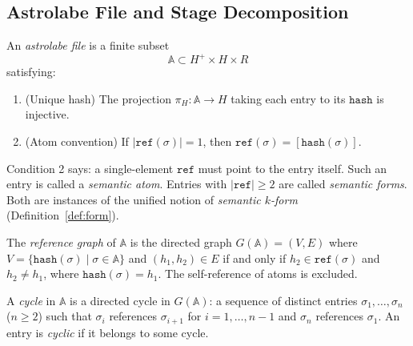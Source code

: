 \subsection{Astrolabe File and Stage Decomposition}

\begin{definition}
\label{def:astrolabe-file}
An \emph{astrolabe file} is a finite subset
\[
\mathbb{A} \subset H^+ \times H \times R
\]
satisfying:
\begin{enumerate}
\item (Unique hash) The projection $\pi_H : \mathbb{A} \to H$ taking each entry to its $\texttt{hash}$ is injective.
\item (Atom convention) If $|\texttt{ref}(\sigma)| = 1$, then $\texttt{ref}(\sigma) = [\texttt{hash}(\sigma)]$.
\end{enumerate}
\end{definition}

Condition 2 says: a single-element $\texttt{ref}$ must point to the entry itself. Such an entry is called a \emph{semantic atom}. Entries with $|\texttt{ref}| \geq 2$ are called \emph{semantic forms}. Both are instances of the unified notion of \emph{semantic $k$-form} (Definition~\ref{def:form}).

\begin{definition}
\label{def:reference-graph}
The \emph{reference graph} of $\mathbb{A}$ is the directed graph $G(\mathbb{A}) = (V, E)$ where $V = \{\texttt{hash}(\sigma) \mid \sigma \in \mathbb{A}\}$ and $(h_1, h_2) \in E$ if and only if $h_2 \in \texttt{ref}(\sigma)$ and $h_2 \neq h_1$, where $\texttt{hash}(\sigma) = h_1$. The self-reference of atoms is excluded.
\end{definition}

\begin{definition}[Cycle]
\label{def:cycle}
A \emph{cycle} in $\mathbb{A}$ is a directed cycle in $G(\mathbb{A})$: a sequence of distinct entries $\sigma_1, \ldots, \sigma_n$ ($n \geq 2$) such that $\sigma_i$ references $\sigma_{i+1}$ for $i = 1, \ldots, n-1$ and $\sigma_n$ references $\sigma_1$. An entry is \emph{cyclic} if it belongs to some cycle.
\end{definition}

